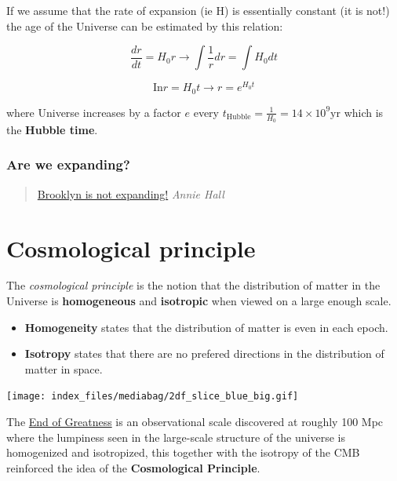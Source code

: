 \documentclass[
  letterpaper,
  DIV=11,
  numbers=noendperiod]{scrreprt}
\providecommand{\tightlist}{%
  \setlength{\itemsep}{0pt}\setlength{\parskip}{0pt}}\usepackage{longtable,booktabs,array}
\begin{document}
If we assume that the rate of expansion (ie H) is essentially constant
(it is not!) the age of the Universe can be estimated by this relation:

\[\frac{d r}{dt} = H_0 r \rightarrow \int \frac{1}{r}dr =\int H_0 dt\]

\[ \mathrm{ In} r = H_0 t \rightarrow r = e^{H_0 t}\]

where Universe increases by a factor \(e\) every
\(t_{\mathrm{Hubble}} = \frac{1}{H_0} = 14\times 10^9\mathrm{ yr}\)
which is the \textbf{Hubble time}.

\subsubsection*{Are we expanding?}\label{are-we-expanding}

\begin{quote}
\href{https://www.youtube.com/watch?v=5U1-OmAICpU}{Brooklyn is not
expanding!} \emph{Annie Hall}
\end{quote}

\section*{Cosmological principle}\label{cosmological-principle}


The \emph{cosmological principle} is the notion that the distribution of
matter in the Universe is \textbf{homogeneous} and \textbf{isotropic}
when viewed on a large enough scale.

\begin{itemize}
\tightlist
\item
  \textbf{Homogeneity} states that the distribution of matter is even in
  each epoch.
\item
  \textbf{Isotropy} states that there are no prefered directions in the
  distribution of matter in space.
\end{itemize}

\begin{center}
\texttt{[image: index\_files/mediabag/2df\_slice\_blue\_big.gif]}
\end{center}

The
\href{http://en.wikipedia.org/wiki/Observable_universe\#End_of_Greatness}{End
of Greatness} is an observational scale discovered at roughly 100 Mpc
where the lumpiness seen in the large-scale structure of the universe is
homogenized and isotropized, this together with the isotropy of the CMB
reinforced the idea of the \textbf{Cosmological Principle}.
\end{document}
